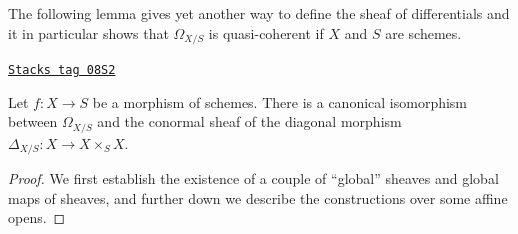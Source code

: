 The following lemma gives yet another way to define the sheaf of
differentials and it in particular shows that $\Omega_{X/S}$
is quasi-coherent if $X$ and $S$ are schemes.

\begin{lemma}
\label{morphisms-lemma-differentials-diagonal}
\href{https://stacks.math.columbia.edu/tag/08S2}{\texttt{Stacks tag 08S2}}

Let $f : X \to S$ be a morphism of schemes. There is a canonical
isomorphism between $\Omega_{X/S}$ and the conormal sheaf of
the diagonal morphism $\Delta_{X/S} : X \longrightarrow X \times_S X$.
\end{lemma}

\begin{proof}

We first establish the existence of a couple of ``global'' sheaves
and global maps of sheaves, and further down we describe
the constructions over some affine opens.


\end{proof}
